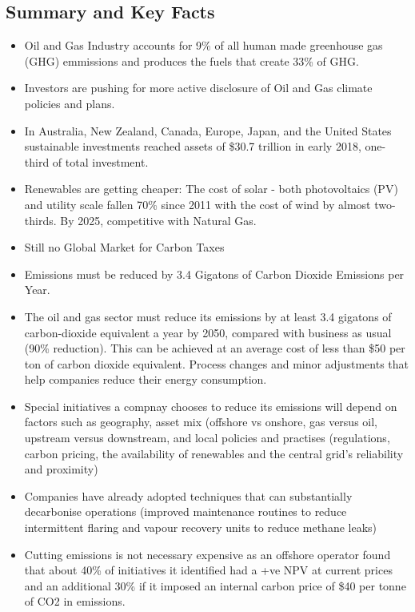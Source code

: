 \documentclass[12pt]{article}
\begin{document}
    \subsection{Summary and Key Facts}
    \begin{itemize}
        \item Oil and Gas Industry accounts for 9\% of all human made greenhouse gas (GHG) emmissions and produces the fuels that create 33\% of GHG.
        \item Investors are pushing for more active disclosure of Oil and Gas climate policies and plans.
        \item In Australia, New Zealand, Canada, Europe, Japan, and the United States sustainable investments reached assets of \$30.7 trillion in early 2018, one-third of total investment.
        \item Renewables are getting cheaper: The cost of solar - both photovoltaics (PV) and utility scale fallen 70\% since 2011 with the cost of wind by almost two-thirds. By 2025, competitive with Natural Gas.
        \item Still no Global Market for Carbon Taxes
        \item Emissions must be reduced by 3.4 Gigatons of Carbon Dioxide Emissions per Year.
        \item The oil and gas sector must reduce its emissions by at least 3.4 gigatons of carbon-dioxide equivalent a year by 2050, compared with business as usual (90\% reduction). This can be achieved at an average cost of less than \$50 per ton of carbon dioxide equivalent. Process changes and minor adjustments that help companies reduce their energy consumption.
        \item Special initiatives a compnay chooses to reduce its emissions will depend on factors such as geography, asset mix (offshore vs onshore, gas versus oil, upstream versus downstream, and local policies and practises (regulations, carbon pricing, the availability of renewables and the central grid's reliability and proximity)
        \item Companies have already adopted techniques that can substantially decarbonise operations (improved maintenance routines to reduce intermittent flaring and vapour recovery units to reduce methane leaks)
        \item Cutting emissions is not necessary expensive as an offshore operator found that about 40\% of initiatives it identified had a +ve NPV at current prices and an additional 30\% if it imposed an internal carbon price of \$40 per tonne of CO2 in emissions.

\end{itemize}
\end{document}
